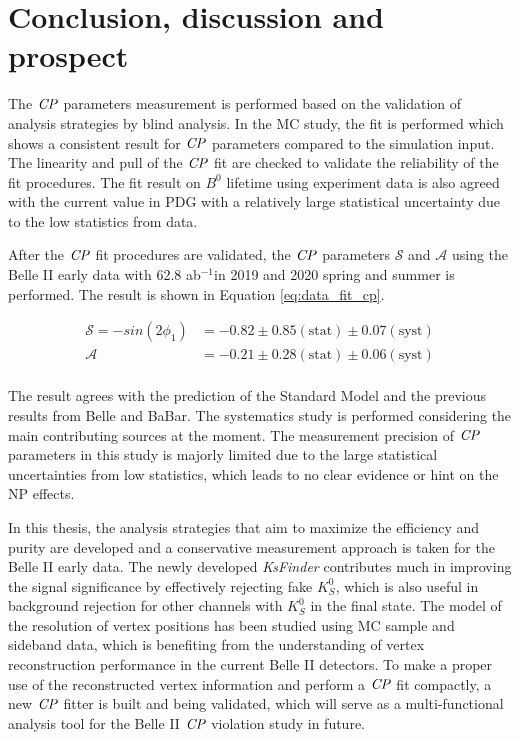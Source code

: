 \chapter{Conclusion, discussion and prospect}
The $\it{CP}$ parameters measurement is performed based on the validation of analysis strategies by blind analysis.  
In the MC study, the fit is performed which shows a consistent result for $\it{CP}$ parameters compared to the simulation input. The linearity and pull of the $\it{CP}$ fit are checked to validate the reliability of the fit procedures. The fit result on $B^0$ lifetime using experiment data is also agreed with the current value in PDG with a relatively large statistical uncertainty due to the low statistics from data.

After the $\it{CP}$ fit procedures are validated, the $\it{CP}$ parameters $\mathcal{S}$ and $\mathcal{A}$ using the Belle II early data with 62.8 ab$^{-1}$in 2019 and 2020 spring and summer is performed. The result is shown in Equation \ref{eq:data_fit_cp}.

\begin{equation}\label{eq:data_fit_cp}
\begin{split}
\mathcal{S}=- sin(2\phi_1) & = -0.82 \pm 0.85(\text{stat}) \pm 0.07(\text{syst}) \\
\mathcal{A} & = -0.21\pm 0.28(\text{stat}) \pm 0.06(\text{syst})\\
\end{split}
\end{equation}  

The result agrees with the prediction of the Standard Model and the previous results from Belle\cite{kang2020measurement} and BaBar\cite{lees2012amplitude}. The systematics study is performed considering the main contributing sources at the moment. The measurement precision of $\it{CP}$ parameters in this study is majorly limited due to the large statistical uncertainties from low statistics, which leads to no clear evidence or hint on the NP effects. 
 
In this thesis, the analysis strategies that aim to maximize the efficiency and purity are developed and a conservative measurement approach is taken for the Belle II early data. The newly developed \textit{KsFinder} contributes much in improving the signal significance by effectively rejecting fake $K_S^0$, which is also useful in background rejection for other channels with $K_S^0$ in the final state.  The model of the resolution of vertex positions has been studied using MC sample and sideband data, which is benefiting from the understanding of vertex reconstruction performance in the current Belle II detectors. To make a proper use of the reconstructed vertex information and perform a $\it{CP}$ fit compactly, a new $\it{CP}$ fitter is built and being validated, which will serve as a multi-functional analysis tool for the Belle II $\it{CP}$ violation study in future. 
 
